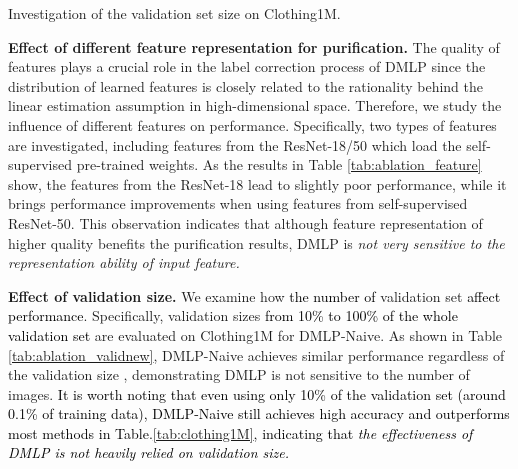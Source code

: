 \documentclass[10pt,twocolumn,letterpaper]{article}
\newcommand{\zbs}[1]{\textcolor{black}{#1}}
\begin{document}
\begin{table}[!t]
\small
    \caption{
        Investigation of the validation set size  on Clothing1M.} 
    \vspace{-1em}
    \centering 
    \setlength{\tabcolsep}{1mm}{
    \resizebox{0.43\textwidth}{!}{\tau}}
    \label{tab:ablation_validnew} 
    \vspace{-4mm}
\end{table} 














\textbf{Effect of different feature {representation for purification.}} The quality of features plays a crucial role in the label correction process of DMLP since {the distribution of learned features} is closely related to {the rationality behind the linear estimation assumption in high-dimensional space}. Therefore, we study the influence of different features on performance. Specifically, two types of features are investigated, including features from the ResNet-18/50 which load the self-supervised pre-trained weights. As the results in Table \ref{tab:ablation_feature} show, the features from the ResNet-18 lead to slightly poor performance, {while} it brings performance improvements when using features from self-supervised ResNet-50. {This observation indicates that although feature representation of higher quality benefits the purification results, DMLP is \emph{not very sensitive to the representation ability of input feature.}} 













 \textbf{{Effect of validation size}.} We examine how \zbs{the number of} validation set \zbs{affect performance}. Specifically, {validation} sizes \zbs{from 10\% to 100\% of the whole validation set} are evaluated on Clothing1M {for DMLP-Naive}. As shown in Table \ref{tab:ablation_validnew}, 
DMLP-Naive achieves similar performance regardless of the validation size ,
demonstrating DMLP is not sensitive to the number of images. \zbs{It is worth noting that even using only 10\% of the validation set (around 0.1\% of training data), DMLP-Naive still achieves high accuracy and outperforms most methods in Table.\ref{tab:clothing1M}, indicating that \emph{the effectiveness of DMLP is not heavily relied on validation size.}}
\end{document}
